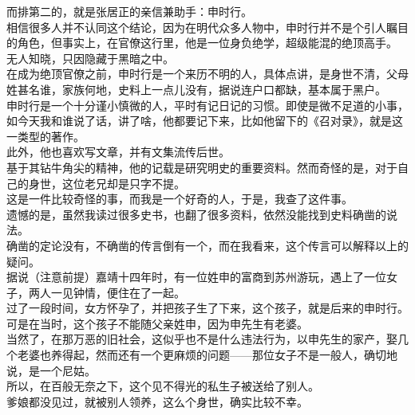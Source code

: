 \begin{multicols}{\theparacolNo}
而排第二的，就是张居正的亲信兼助手：申时行。\\

相信很多人并不认同这个结论，因为在明代众多人物中，申时行并不是个引人瞩目的角色，但事实上，在官僚这行里，他是一位身负绝学，超级能混的绝顶高手。\\

无人知晓，只因隐藏于黑暗之中。\\

在成为绝顶官僚之前，申时行是一个来历不明的人，具体点讲，是身世不清，父母姓甚名谁，家族何地，史料上一点儿没有，据说连户口都缺，基本属于黑户。\\

申时行是一个十分谨小慎微的人，平时有记日记的习惯。即使是微不足道的小事，如今天我和谁说了话，讲了啥，他都要记下来，比如他留下的《召对录》，就是这一类型的著作。\\

此外，他也喜欢写文章，并有文集流传后世。\\

基于其钻牛角尖的精神，他的记载是研究明史的重要资料。然而奇怪的是，对于自己的身世，这位老兄却是只字不提。\\

这是一件比较奇怪的事，而我是一个好奇的人，于是，我查了这件事。\\

遗憾的是，虽然我读过很多史书，也翻了很多资料，依然没能找到史料确凿的说法。\\

确凿的定论没有，不确凿的传言倒有一个，而在我看来，这个传言可以解释以上的疑问。\\

据说（注意前提）嘉靖十四年时，有一位姓申的富商到苏州游玩，遇上了一位女子，两人一见钟情，便住在了一起。\\

过了一段时间，女方怀孕了，并把孩子生了下来，这个孩子，就是后来的申时行。\\

可是在当时，这个孩子不能随父亲姓申，因为申先生有老婆。\\

当然了，在那万恶的旧社会，这似乎也不是什么违法行为，以申先生的家产，娶几个老婆也养得起，然而还有一个更麻烦的问题——那位女子不是一般人，确切地说，是一个尼姑。\\

所以，在百般无奈之下，这个见不得光的私生子被送给了别人。\\

爹娘都没见过，就被别人领养，这么个身世，确实比较不幸。\\


\end{multicols}
